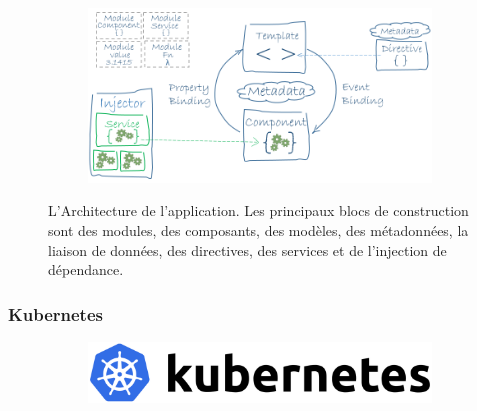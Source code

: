 \documentclass{article}
\begin{document}
\begin{figure}[h!]
	\centering
	\begin{subfigure}[b]{0.9\linewidth}
  \includegraphics[width=\linewidth]{Angularf.png}
	\end{subfigure}
	\caption{L'Architecture de l'application. Les principaux blocs de construction sont des modules, des composants, des modèles, des métadonnées, la liaison de données, des directives, des services et de l'injection de dépendance.}
\end{figure}
\newpage
\subsubsection{Kubernetes}

\begin{figure}[h!]
	\centering
  	\begin{subfigure}[b]{0.4\linewidth}
    \includegraphics[width=\linewidth]{kube.png}
  	\end{subfigure}
\end{figure}
\end{document}
